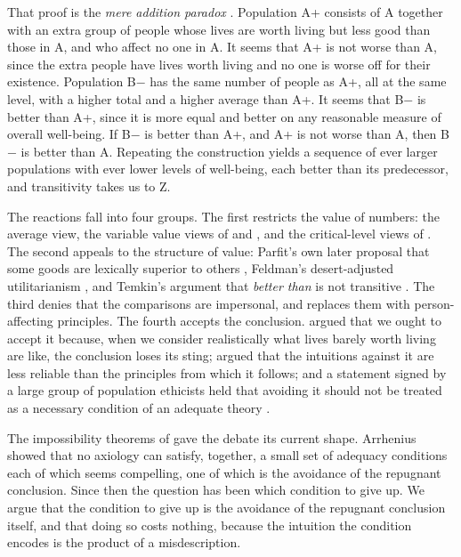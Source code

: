 \documentclass{situationist-preprint}
\begin{document}
That proof is the \emph{mere addition paradox} \citep[ch.~19]{Parfit1984}. Population A+ consists of A together with an extra group of people whose lives are worth living but less good than those in A, and who affect no one in A. It seems that A+ is not worse than A, since the extra people have lives worth living and no one is worse off for their existence. Population B$-$ has the same number of people as A+, all at the same level, with a higher total and a higher average than A+. It seems that B$-$ is better than A+, since it is more equal and better on any reasonable measure of overall well-being. If B$-$ is better than A+, and A+ is not worse than A, then B$-$ is better than A. Repeating the construction yields a sequence of ever larger populations with ever lower levels of well-being, each better than its predecessor, and transitivity takes us to Z.

The reactions fall into four groups. The first restricts the value of numbers: the average view, the variable value views of \citet{Hurka1983} and \citet{Ng1989}, and the critical-level views of \citet{Blackorby2005}. The second appeals to the structure of value: Parfit's own later proposal that some goods are lexically superior to others \citep{Parfit1986}, Feldman's desert-adjusted utilitarianism \citep{Feldman1995}, and Temkin's argument that \emph{better than} is not transitive \citep{Temkin2012}. The third denies that the comparisons are impersonal, and replaces them with person-affecting principles. The fourth accepts the conclusion. \citet{Tannsjo2002} argued that we ought to accept it because, when we consider realistically what lives barely worth living are like, the conclusion loses its sting; \citet{Huemer2008} argued that the intuitions against it are less reliable than the principles from which it follows; and a statement signed by a large group of population ethicists held that avoiding it should not be treated as a necessary condition of an adequate theory \citep{Zuber2021}.

The impossibility theorems of \citet{Arrhenius2000} gave the debate its current shape. Arrhenius showed that no axiology can satisfy, together, a small set of adequacy conditions each of which seems compelling, one of which is the avoidance of the repugnant conclusion. Since then the question has been which condition to give up. We argue that the condition to give up is the avoidance of the repugnant conclusion itself, and that doing so costs nothing, because the intuition the condition encodes is the product of a misdescription.
\end{document}
